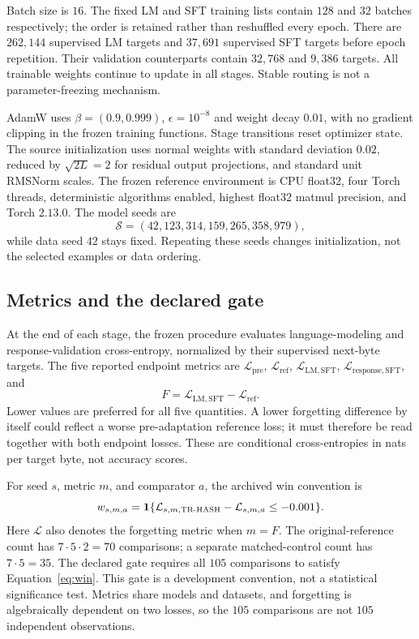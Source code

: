 \documentclass{article}
\newcommand{\Ind}{\mathbf{1}}
\newcommand{\TR}{\textsc{TR-HASH}}
\newcommand{\CE}{\mathcal{L}}
\begin{document}
Batch size is $16$. The fixed LM and SFT training lists contain $128$ and $32$ batches respectively; the order is retained rather than reshuffled every epoch. There are $262{,}144$ supervised LM targets and $37{,}691$ supervised SFT targets before epoch repetition. Their validation counterparts contain $32{,}768$ and $9{,}386$ targets. All trainable weights continue to update in all stages. Stable routing is not a parameter-freezing mechanism.

AdamW \citep{loshchilov2019adamw} uses $\beta=(0.9,0.999)$, $\epsilon=10^{-8}$ and weight decay $0.01$, with no gradient clipping in the frozen training functions. Stage transitions reset optimizer state. The source initialization uses normal weights with standard deviation $0.02$, reduced by $\sqrt{2L}=2$ for residual output projections, and standard unit RMSNorm scales. The frozen reference environment is CPU float32, four Torch threads, deterministic algorithms enabled, highest float32 matmul precision, and Torch $2.13.0$. The model seeds are
\begin{equation}
 \mathcal S=(42,123,314,159,265,358,979),
\end{equation}
while data seed $42$ stays fixed. Repeating these seeds changes initialization, not the selected examples or data ordering.

\subsection{Metrics and the declared gate}
At the end of each stage, the frozen procedure evaluates language-modeling and response-validation cross-entropy, normalized by their supervised next-byte targets. The five reported endpoint metrics are $\CE_{\mathrm{pre}}$, $\CE_{\mathrm{ref}}$, $\CE_{\mathrm{LM,SFT}}$, $\CE_{\mathrm{response,SFT}}$, and
\begin{equation}
 F=\CE_{\mathrm{LM,SFT}}-\CE_{\mathrm{ref}}.
 \label{eq:forgetting}
\end{equation}
Lower values are preferred for all five quantities. A lower forgetting difference by itself could reflect a worse pre-adaptation reference loss; it must therefore be read together with both endpoint losses. These are conditional cross-entropies in nats per target byte, not accuracy scores.

For seed $s$, metric $m$, and comparator $a$, the archived win convention is
\begin{equation}
 w_{s,m,a}=\Ind\{\CE_{s,m,\TR}-\CE_{s,m,a}\le -0.001\}.
 \label{eq:win}
\end{equation}
Here $\CE$ also denotes the forgetting metric when $m=F$. The original-reference count has $7\cdot5\cdot2=70$ comparisons; a separate matched-control count has $7\cdot5=35$. The declared gate requires all $105$ comparisons to satisfy Equation~\ref{eq:win}. This gate is a development convention, not a statistical significance test. Metrics share models and datasets, and forgetting is algebraically dependent on two losses, so the $105$ comparisons are not $105$ independent observations.
\end{document}
